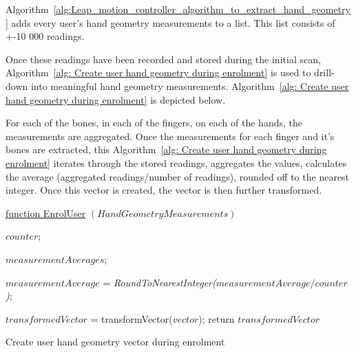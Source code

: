 
Algorithm~\ref{alg:Leap_motion_controller_algorithm_to_extract_hand_geometry} adds every user's hand geometry measurements to a list. This list consists of +-10 000 readings.

Once these readings have been recorded and stored during the initial scan, Algorithm~\ref{alg: Create user hand geometry during enrolment} is used to drill-down into meaningful hand geometry measurements. Algorithm~\ref{alg: Create user hand geometry during enrolment} is depicted below.

For each of the bones, in each of the fingers, on each of the hands, the measurements are aggregated. Once the measurements for each finger and it's bones are extracted, this Algorithm~\ref{alg: Create user hand geometry during enrolment} iterates through the stored readings, aggregates the values, calculates the average (aggregated readings/number of readings), rounded off to the nearest integer. Once this vector is created, the vector is then further transformed. 


\begin{algorithm}
    \underline{function EnrolUser} $(HandGeometryMeasurements)$\;
    
    $counter$; 
    
    $measurementAverages$; 
    
    $measurementAverage$ = \textit{RoundToNearestInteger($measurementAverage/counter$)};
    
    
    
        $transformedVector$ = transformVector($vector$);
    return $transformedVector$
    \caption{Create user hand geometry vector during enrolment}
    \label{alg: Create user hand geometry during enrolment}
    
\end{algorithm}


